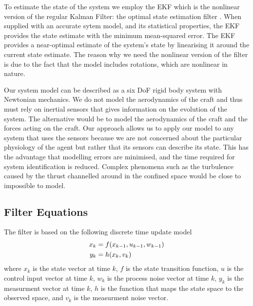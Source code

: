 \documentclass[]{article}
\begin{document}
{To estimate the state of the system we employ the \ac{EKF} which is the nonlinear version of the regular Kalman Filter: the optimal state estimation filter \cite{todo}. When supplied with an accurate sytem model, and its statistical properties, the EKF provides the state estimate with the minimum mean-squared error.
The \ac{EKF} provides a near-optimal estimate of the system's state by linearising it around the current state estimate. The reason why we need the nonlinear version of the filter is due to the fact that the model includes rotations, which are nonlinear in nature.


Our system model can be described as a six \ac{DoF} rigid body system with Newtonian mechanics. We do not model the aerodynamics of the craft and thus must rely on inertial sensors that gives information on the evolution of the system\cite{OpenPilotPaper}. The alternative would be to model the aerodynamics of the craft and the forces acting on the craft. Our approach allows us to apply our model to any system that uses the sensors because we are not concerned about the particular physiology of the agent but rather that its sensors can describe its state.
This has the advantage that modelling errors are minimised, and the time required for system identification is reduced.
Complex phenomena such as the turbulence caused by the thrust channelled around in the confined space would be close to impossible to model.

\subsection{Filter Equations} %
\label{sub:filter_equations}

The filter is based on the following discrete time update model
\begin{align}
	x_k &= f(x_{k-1}, u_{k-1}, w_{k-1}) \notag \\
	y_k &= h(x_k, v_k)
	\label{eqn:system}
\end{align}
where $x_k$ is the state vector at time $k$, $f$ is the state transition function, $u$ is the control input vector at time $k$, $w_k$ is the process noise vector at time $k$, $y_k$ is the measurment vector at time $k$, $h$ is the function that maps the state space to the observed space, and $v_k$ is the measurment noise vector.

}
\end{document}
